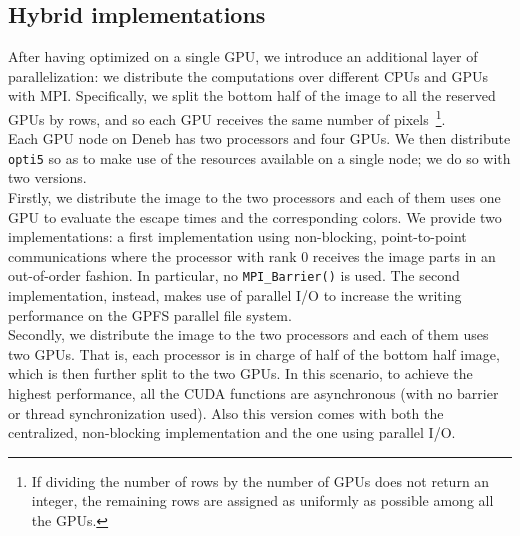 \documentclass[11pt,a4paper]{article}
\begin{document}
\vspace*{-0.27cm}
\subsection{Hybrid implementations}

After having optimized on a single GPU, we introduce an additional layer of parallelization: we distribute the computations over different CPUs and GPUs with MPI.
Specifically, we split the bottom half of the image to all the reserved GPUs by rows, and so each GPU receives the same number of pixels~\footnote{If dividing the number of rows by the number of GPUs does not return an integer, the remaining rows are assigned as uniformly as possible among all the GPUs.}.\\
Each GPU node on Deneb has two processors and four GPUs.
We then distribute \texttt{opti5} so as to make use of the resources available on a single node; we do so with two versions.\\[-7pt]

Firstly, we distribute the image to the two processors and each of them uses one GPU to evaluate the escape times and the corresponding colors.
We provide two implementations: a first implementation using non-blocking, point-to-point communications where the processor with rank $0$ receives the image parts in an out-of-order fashion.
In particular, no \texttt{MPI\_Barrier()} is used.
The second implementation, instead, makes use of parallel I/O to increase the writing performance on the GPFS parallel file system.\\[-7pt]

Secondly, we distribute the image to the two processors and each of them uses two GPUs.
That is, each processor is in charge of half of the bottom half image, which is then further split to the two GPUs.
In this scenario, to achieve the highest performance, all the CUDA functions are asynchronous (with no barrier or thread synchronization used).
Also this version comes with both the centralized, non-blocking implementation and the one using parallel I/O.\\[-7pt]
\end{document}
